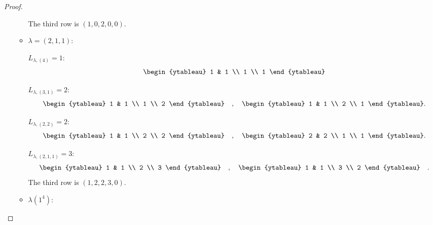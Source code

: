 \documentclass[12pt]{extarticle}
\newcommand{\<}{\langle}
\renewcommand{\>}{\rangle}
\theoremstyle{definition}
\begin{document}
\begin{proof}
\begin{enumerate}
\begin{itemize}
      The third row is $(1,0,2,0,0)$.

    \item 
      $\lambda=(2,1,1)$:

      $L_{\lambda,(4)} = 1$:
      \begin{align*}
        \begin{ytableau}
          1 & 1 \\
          1 \\
          1
        \end{ytableau}
      \end{align*}

      $L_{\lambda, (3,1)} = 2 $:
      \begin{align*}
        \begin{ytableau}
          1 & 1 \\
          1 \\
          2
        \end{ytableau}\quad,\quad
        \begin{ytableau}
          1 & 1 \\
          2 \\
          1
        \end{ytableau}.
      \end{align*}

      $L_{\lambda, (2,2)} = 2 $:
      \begin{align*}
        \begin{ytableau}
          1 & 1 \\
          2 \\
          2
        \end{ytableau}\quad,\quad
        \begin{ytableau}
          2 & 2 \\
          1 \\
          1
        \end{ytableau}.
      \end{align*}

      $L_{\lambda, (2,1,1)} = 3 $:
      \begin{align*}
        \begin{ytableau}
          1 & 1 \\
          2 \\
          3
        \end{ytableau}\quad,\quad
        \begin{ytableau}
          1 & 1 \\
          3 \\
          2
        \end{ytableau} \quad .
      \end{align*}
      The third row is $(1,2,2,3,0)$.
    \item
      $\lambda(1^4)$:


\end{itemize}
\end{enumerate}
\end{proof}
\end{document}
